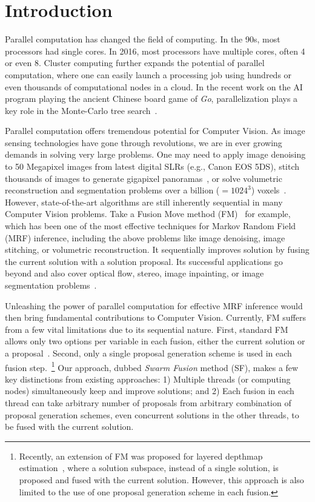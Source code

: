 \section{Introduction}
Parallel computation has changed the field of computing.  In the 90s,
most processors had single cores. In 2016, most processors have multiple
cores, often 4 or even 8. Cluster computing further expands the
potential of parallel computation, where one can easily launch a
processing job using hundreds or even thousands of computational nodes
in a cloud.
%
In the recent work on the AI program playing the ancient Chinese board
game of {\it Go}, parallelization plays a key role in the Monte-Carlo
tree search~\cite{nature_alpha_go}.


Parallel computation offers tremendous potential for Computer Vision. As
image sensing technologies have gone through revolutions, we are in
ever growing demands in solving very large problems. One may need to
apply image denoising to 50 Megapixel images from latest digital
SLRs (e.g., Canon EOS 5DS), stitch thousands of images to generate gigapixel
panoramas~\cite{gigapan}, or solve volumetric reconstruction and
segmentation problems over a billion ($=1024^3$)
voxels~\cite{Joint3DSceneReconstructionandclassSegmentation}.
%
%
However, state-of-the-art algorithms are still inherently sequential in
many Computer Vision problems. Take a Fusion Move method
(FM)~\cite{viktor,second_order_stereo,else} for example, which has been
one of the most effective techniques for Markov Random Field (MRF)
inference, including the above problems like image denoising, image
stitching, or volumetric reconstruction.
%
It sequentially improves solution by fusing the current solution with a
solution proposal. Its successful applications go beyond and also cover
optical flow, stereo, image inpainting, or image segmentation
problems~\cite{fusion_moves_for_markov_random_field_optimization}.


Unleashing the power of parallel computation for effective MRF inference
would then bring fundamental contributions to Computer
Vision. Currently, FM suffers from a few vital limitations due to its
sequential nature. First, standard FM allows only two options per
variable in each fusion, either the current solution or a
proposal~\cite{fusion_moves_for_markov_random_field_optimization}. Second,
only a single proposal generation scheme is used in each fusion
step.~\footnote{Recently, an extension of FM was proposed for layered
depthmap estimation~\cite{chen_2016}, where a solution subspace, instead
of a single solution, is proposed and fused with the current
solution. However, this approach is also limited to the use of one proposal
generation scheme in each fusion.}
%
Our approach, dubbed {\it Swarm Fusion} method (SF), makes a
few key distinctions from existing approaches: 1) Multiple threads (or
computing nodes) simultaneously keep and improve solutions; and 2) Each
fusion in each thread can take arbitrary number of proposals from
arbitrary combination of proposal generation schemes, even concurrent
solutions in the other threads, to be fused with the current solution.
%


